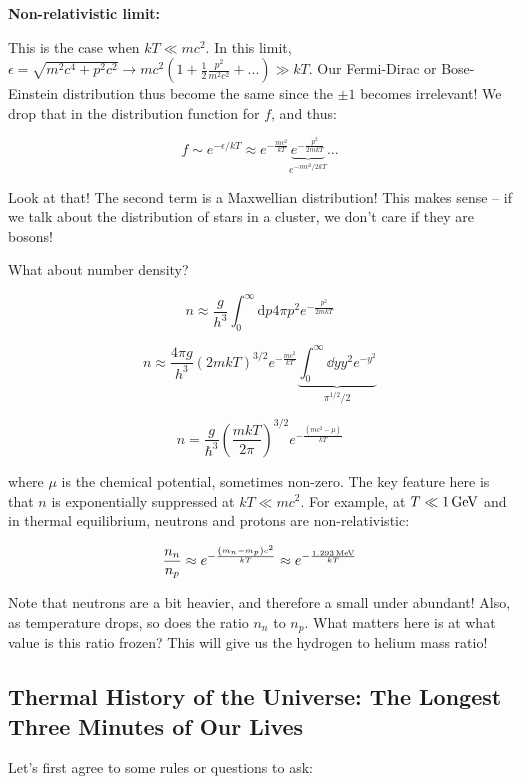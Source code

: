 \documentclass{article}
\newcommand{\unit}[1]{{\,\rm #1}}
\newcommand{\be}{\begin{equation}}
\newcommand{\ee}{\end{equation}}
\begin{document}
\noindent\textbf{Non-relativistic limit:}

This is the case when $kT \ll mc^2$. In this limit, $\epsilon = \sqrt{m^2c^4 + p^2 c^2} \rightarrow mc^2 \left(1+\frac{1}{2}\frac{p^2}{m^2c^2} + ...\right) \gg kT$. Our Fermi-Dirac or Bose-Einstein distribution thus become the same since the $\pm 1$ becomes irrelevant! We drop that in the distribution function for $f$, and thus:

\be
f \sim e^{-\epsilon/kT} \approx e^{-\frac{mc^2}{kT}}\underbrace{e^{-\frac{p^2}{2mkT}}}_{e^{-mv^2/2kT}}...
\ee

Look at that! The second term is a 
Maxwellian distribution! This makes sense -- if we talk about the distribution of stars in a cluster, we don't care if they are bosons!

What about number density? 

\be
n \approx \frac{g}{h^3} \int_0^\infty \mathrm{d} p 4\pi p^2 e^{-\frac{p^2}{2mkT}}
\ee

\be
n \approx \frac{4\pi g}{h^3} \left(2mkT\right)^{3/2} e^{-\frac{mc^2}{kT}} \underbrace{\int_0^\infty \dd{y} y^2 e^{-y^2}}_{\pi^{1/2}/2}
\ee

\be
\boxed{n = \frac{g}{\hbar^3} \left(\frac{mkT}{2\pi}\right)^{3/2} e^{-\frac{\left(mc^2 - \mu\right)}{kT}}}
\ee

where $\mu$ is the chemical potential, sometimes non-zero. The key feature here is that $n$ is exponentially suppressed at $kT \ll mc^2$. For example, at $T \ll 1 \unit{GeV}$ and in thermal equilibrium, neutrons and protons are non-relativistic:

\be
\frac{n_n}{n_p} \approx e^{-\frac{\left(m_n - m_p\right)c^2}{kT}} \approx e^{-\frac{1.293 \unit{MeV}}{kT}}
\ee

Note that neutrons are a bit heavier, and therefore a small under abundant! Also, as temperature drops, so does the ratio $n_n$ to $n_p$. What matters here is at what value is this ratio frozen? This will give us the hydrogen to helium mass ratio! 

\subsection{Thermal History of the Universe: The Longest Three Minutes of Our Lives}

Let's first agree to some rules or questions to ask:
\end{document}
